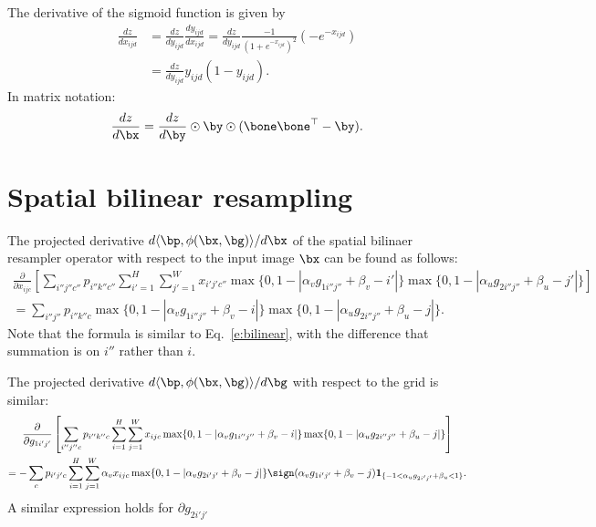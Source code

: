 The derivative of the sigmoid function is given by
\begin{align*}
\frac{dz}{dx_{ijd}}
&= 
\frac{dz}{d y_{ijd}} 
\frac{d y_{ijd}}{d x_{ijd}}
=
\frac{dz}{d y_{ijd}} 
\frac{-1}{(1+e^{-x_{ijd}})^2} ( - e^{-x_{ijd}})
\\
&=
\frac{dz}{d y_{ijd}} 
y_{ijd} (1 - y_{ijd}).
\end{align*}
In matrix notation:
\[
\frac{dz}{d\bx} = \frac{dz}{d\by} \odot 
\by \odot 
(\bone\bone^\top - \by).
\]


\section{Spatial bilinear resampling}\label{s:impl-sampler}

The projected derivative $d\langle \bp, \phi(\bx,\bg)\rangle / d\bx$ of the spatial bilinaer resampler operator with respect to the input image $\bx$ can be found as follows:
\begin{multline}\label{e:bilinear-back-x}
  \frac{\partial}{\partial x_{ijc}}
  \left[
  \sum_{i''j''c''}
  p_{i''k''c''}
  \sum_{i'=1}^H
  \sum_{j'=1}^W 
  x_{i'j'c''}
  \max\{0, 1-|\alpha_v g_{1i''j''} + \beta_v -i'|\}
  \max\{0, 1-|\alpha_u g_{2i''j''} + \beta_u -j'|\}
  \right]
  \\
=
  \sum_{i''j''}
  p_{i''k''c}
  \max\{0, 1-|\alpha_v g_{1i''j''} + \beta_v -i|\}
  \max\{0, 1-|\alpha_u g_{2i''j''} + \beta_u -j|\}.
\end{multline}
Note that the formula is similar to Eq.~\ref{e:bilinear}, with the difference that summation is on $i''$ rather than $i$.

The projected derivative $d\langle \bp, \phi(\bx,\bg)\rangle / d\bg$ with respect to the grid is similar:
\begin{multline}\label{e:bilinear-back-g}
  \frac{\partial}{\partial g_{1i'j'}}
  \left[
  \sum_{i''j''c}
  p_{i''k''c}
  \sum_{i=1}^H
  \sum_{j=1}^W 
  x_{ijc}
  \max\{0, 1-|\alpha_v g_{1i''j''} + \beta_v -i|\}
  \max\{0, 1-|\alpha_u g_{2i''j''} + \beta_u -j|\}
  \right]
  \\
=
  -
  \sum_c
  p_{i'j'c}
  \sum_{i=1}^H
  \sum_{j=1}^W
  \alpha_v x_{ijc}
  \max\{0, 1-|\alpha_v g_{2i'j'} + \beta_v -j|\}
  \sign(\alpha_v g_{1i'j'} + \beta_v -j)
  \mathbf{1}_{\{-1 < \alpha_u g_{2i'j'} + \beta_u < 1\}}.
\end{multline}
A similar expression holds for $\partial g_{2i'j'}$

